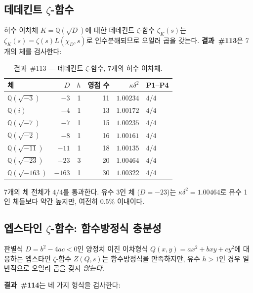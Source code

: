 \documentclass[11pt, a4paper]{article}
\theoremstyle{plain}
\theoremstyle{definition}
\begin{document}
\subsection{데데킨트 $\zeta$-함수}
\label{sec:dedekind}

허수 이차체 $K=\mathbb{Q}(\sqrt{D})$에 대한
데데킨트 $\zeta$-함수 $\zeta_{K}(s)$는
$\zeta_{K}(s) = \zeta(s)L(\chi_{D},s)$로 인수분해되므로
오일러 곱을 갖는다.
\textbf{결과~\#113}은 7개의 체를 검사한다:

\begin{table}[ht]
\centering
\caption{결과~\#113 — 데데킨트 $\zeta$-함수, 7개의 허수 이차체.}
\label{tab:ded113}
\small
\begin{tabular}{lrrrrl}
\toprule
체 & $D$ & $h$ & 영점 수 & $\kappa\delta^{2}$ & P1--P4 \\
\midrule
$\mathbb{Q}(\sqrt{-3})$   & $-3$   & 1 & 11 & $1.00234$ & $4/4$ \\
$\mathbb{Q}(i)$           & $-4$   & 1 & 13 & $1.00172$ & $4/4$ \\
$\mathbb{Q}(\sqrt{-7})$   & $-7$   & 1 & 15 & $1.00235$ & $4/4$ \\
$\mathbb{Q}(\sqrt{-2})$   & $-8$   & 1 & 16 & $1.00161$ & $4/4$ \\
$\mathbb{Q}(\sqrt{-11})$  & $-11$  & 1 & 18 & $1.00135$ & $4/4$ \\
$\mathbb{Q}(\sqrt{-23})$  & $-23$  & 3 & 20 & $1.00464$ & $4/4$ \\
$\mathbb{Q}(\sqrt{-163})$ & $-163$ & 1 & 30 & $1.00322$ & $4/4$ \\
\bottomrule
\end{tabular}
\end{table}

7개의 체 전체가 $4/4$를 통과한다.
유수 3인 체 ($D=-23$)는 $\kappa\delta^{2}=1.00464$로
유수 1인 체들보다 약간 높지만, 여전히 $0.5\%$ 이내이다.


\subsection{엡스타인 $\zeta$-함수: 함수방정식 충분성}
\label{sec:epstein}
\label{ssec:thm6}

판별식 $D=b^{2}-4ac<0$인 양정치 이진 이차형식
$Q(x,y)=ax^{2}+bxy+cy^{2}$에 대응하는
엡스타인 $\zeta$-함수 $Z(Q,s)$는 함수방정식을 만족하지만,
유수 $h>1$인 경우 일반적으로 오일러 곱을 갖지 \emph{않는다}.

\textbf{결과~\#114}는 네 가지 형식을 검사한다:
\end{document}
